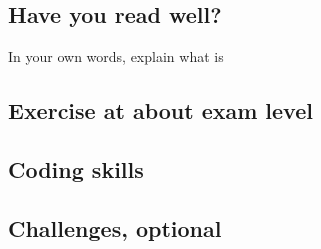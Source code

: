 \documentclass[../../assignments/assignments]{subfiles}
\begin{document}
\subsection{Have you read well?}


\begin{exercise}
In your own words, explain what is
\begin{hint}
\end{hint}
\begin{solution}
\end{solution}
\end{exercise}




\subsection{Exercise at about exam level}



\subsection{Coding skills}




\subsection{Challenges, optional}
\end{document}
